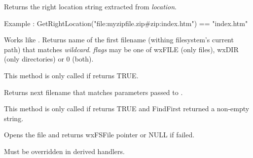 Returns the right location string extracted from {\it location}. 

Example : GetRightLocation("file:myzipfile.zip\#zip:index.htm") == "index.htm"

\label{wxfilesystemhandlerfindfirst}


Works like . Returns name of the first
filename (withing filesystem's current path) that matches {\it wildcard}. {\it flags} may be one of
wxFILE (only files), wxDIR (only directories) or 0 (both).

This method is only called if  returns TRUE.

\label{wxfilesystemhandlerfindnext}


Returns next filename that matches parameters passed to .

This method is only called if  returns TRUE and FindFirst
returned a non-empty string.

\label{wxfilesystemhandleropenfile}


Opens the file and returns wxFSFile pointer or NULL if failed.

Must be overridden in derived handlers.




